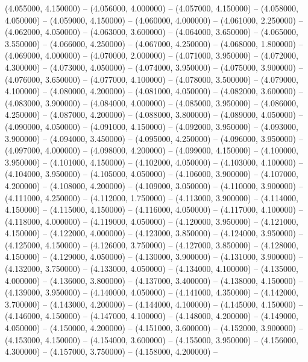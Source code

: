 (4.055000, 4.150000) -- 
(4.056000, 4.000000) -- 
(4.057000, 4.150000) -- 
(4.058000, 4.050000) -- 
(4.059000, 4.150000) -- 
(4.060000, 4.000000) -- 
(4.061000, 2.250000) -- 
(4.062000, 4.050000) -- 
(4.063000, 3.600000) -- 
(4.064000, 3.650000) -- 
(4.065000, 3.550000) -- 
(4.066000, 4.250000) -- 
(4.067000, 4.250000) -- 
(4.068000, 1.800000) -- 
(4.069000, 4.000000) -- 
(4.070000, 2.000000) -- 
(4.071000, 3.950000) -- 
(4.072000, 4.300000) -- 
(4.073000, 4.050000) -- 
(4.074000, 3.950000) -- 
(4.075000, 3.900000) -- 
(4.076000, 3.650000) -- 
(4.077000, 4.100000) -- 
(4.078000, 3.500000) -- 
(4.079000, 4.100000) -- 
(4.080000, 4.200000) -- 
(4.081000, 4.050000) -- 
(4.082000, 3.600000) -- 
(4.083000, 3.900000) -- 
(4.084000, 4.000000) -- 
(4.085000, 3.950000) -- 
(4.086000, 4.250000) -- 
(4.087000, 4.200000) -- 
(4.088000, 3.800000) -- 
(4.089000, 4.050000) -- 
(4.090000, 4.050000) -- 
(4.091000, 4.150000) -- 
(4.092000, 3.950000) -- 
(4.093000, 3.900000) -- 
(4.094000, 3.450000) -- 
(4.095000, 4.250000) -- 
(4.096000, 3.950000) -- 
(4.097000, 4.000000) -- 
(4.098000, 4.200000) -- 
(4.099000, 4.150000) -- 
(4.100000, 3.950000) -- 
(4.101000, 4.150000) -- 
(4.102000, 4.050000) -- 
(4.103000, 4.100000) -- 
(4.104000, 3.950000) -- 
(4.105000, 4.050000) -- 
(4.106000, 3.900000) -- 
(4.107000, 4.200000) -- 
(4.108000, 4.200000) -- 
(4.109000, 3.050000) -- 
(4.110000, 3.900000) -- 
(4.111000, 4.250000) -- 
(4.112000, 1.750000) -- 
(4.113000, 3.900000) -- 
(4.114000, 4.150000) -- 
(4.115000, 4.150000) -- 
(4.116000, 4.050000) -- 
(4.117000, 4.100000) -- 
(4.118000, 4.000000) -- 
(4.119000, 4.050000) -- 
(4.120000, 3.950000) -- 
(4.121000, 4.150000) -- 
(4.122000, 4.000000) -- 
(4.123000, 3.850000) -- 
(4.124000, 3.950000) -- 
(4.125000, 4.150000) -- 
(4.126000, 3.750000) -- 
(4.127000, 3.850000) -- 
(4.128000, 4.150000) -- 
(4.129000, 4.050000) -- 
(4.130000, 3.900000) -- 
(4.131000, 3.900000) -- 
(4.132000, 3.750000) -- 
(4.133000, 4.050000) -- 
(4.134000, 4.100000) -- 
(4.135000, 4.000000) -- 
(4.136000, 3.800000) -- 
(4.137000, 3.400000) -- 
(4.138000, 4.150000) -- 
(4.139000, 3.950000) -- 
(4.140000, 4.050000) -- 
(4.141000, 4.350000) -- 
(4.142000, 3.700000) -- 
(4.143000, 4.200000) -- 
(4.144000, 4.100000) -- 
(4.145000, 4.150000) -- 
(4.146000, 4.150000) -- 
(4.147000, 4.100000) -- 
(4.148000, 4.200000) -- 
(4.149000, 4.050000) -- 
(4.150000, 4.200000) -- 
(4.151000, 3.600000) -- 
(4.152000, 3.900000) -- 
(4.153000, 4.150000) -- 
(4.154000, 3.600000) -- 
(4.155000, 3.950000) -- 
(4.156000, 4.300000) -- 
(4.157000, 3.750000) -- 
(4.158000, 4.200000) -- 

